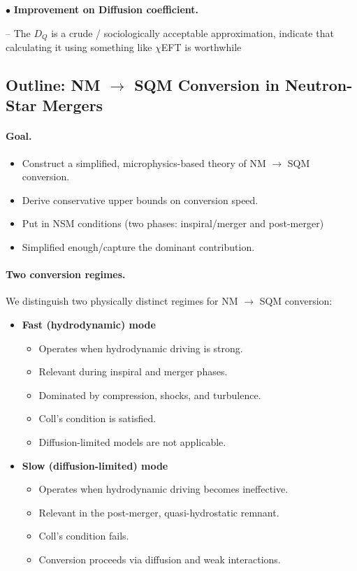 \documentclass[12pt]{article}
\newcommand{\point}[1]{\vspace{1.2em}\noindent$\bullet$ \textbf{#1}\par}
\newcommand{\subpoint}[1]{\vspace{0.3em}\noindent\hspace{1em}-- #1\par}
\begin{document}
\point{Improvement on Diffusion coefficient.}
\subpoint{The $D_Q$ is a crude / sociologically acceptable approximation, indicate that calculating it using something like $\chi$EFT is worthwhile}

\newpage

\subsection*{Outline: NM $\to$ SQM Conversion in Neutron-Star Mergers}

\paragraph{Goal.}
\begin{itemize}
    \item Construct a simplified, microphysics-based theory of NM $\to$ SQM conversion.
    \item Derive conservative upper bounds on conversion speed.
    \item Put in NSM conditions (two phases: inspiral/merger and post-merger)
    \item Simplified enough/capture the dominant contribution.
\end{itemize}

\paragraph{Two conversion regimes.}
We distinguish two physically distinct regimes for NM $\to$ SQM conversion:
\begin{itemize}
    \item \textbf{Fast (hydrodynamic) mode}
    \begin{itemize}
        \item Operates when hydrodynamic driving is strong.
        \item Relevant during inspiral and merger phases.
        \item Dominated by compression, shocks, and turbulence.
        \item Coll's condition is satisfied.
        \item Diffusion-limited models are not applicable.
    \end{itemize}
    
    \item \textbf{Slow (diffusion-limited) mode}
    \begin{itemize}
        \item Operates when hydrodynamic driving becomes ineffective.
        \item Relevant in the post-merger, quasi-hydrostatic remnant.
        \item Coll's condition fails.
        \item Conversion proceeds via diffusion and weak interactions.
    \end{itemize}
\end{itemize}
\end{document}
